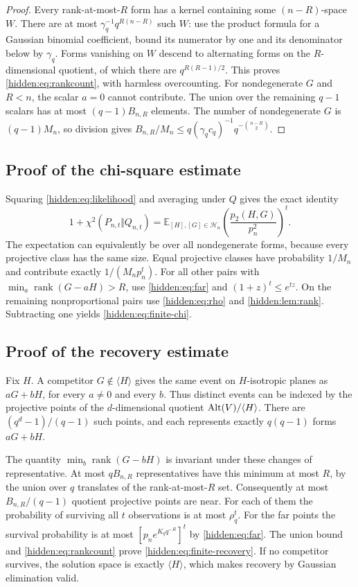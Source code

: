 \begin{proof}
Every rank-at-most-$R$ form has a kernel containing some $(n-R)$-space
$W$. There are at most
$\gamma_q^{-1}q^{R(n-R)}$ such $W$: use the product formula for a Gaussian
binomial coefficient, bound its numerator by one and its denominator
below by $\gamma_q$. Forms vanishing on $W$ descend to alternating forms
on the $R$-dimensional quotient, of which there are $q^{R(R-1)/2}$.
This proves \eqref{hidden:eq:rankcount}, with harmless overcounting.
For nondegenerate $G$ and $R<n$, the scalar $a=0$ cannot contribute.
The union over the remaining $q-1$ scalars has at most $(q-1)B_{n,R}$
elements. The number of nondegenerate $G$ is $(q-1)M_n$, so division
gives $B_{n,R}/M_n\le q(\gamma_qc_q)^{-1}q^{-\binom{n-R}{2}}$.
\end{proof}

\subsection{Proof of the chi-square estimate}

Squaring \eqref{hidden:eq:likelihood} and averaging under $Q$ gives the
exact identity
\begin{equation}\label{hidden:eq:secondmoment}
 1+\chi^2(P_{n,t}\Vert Q_{n,t})
 =\mathbb E_{[H],[G]\in\mathcal H_n}
       \left(\frac{p_2(H,G)}{p_n^2}\right)^t.
\end{equation}
The expectation can equivalently be over all nondegenerate forms,
because every projective class has the same size. Equal projective
classes have probability $1/M_n$ and contribute exactly
$1/(M_np_n^t)$. For all other pairs with
$\min_a\operatorname{rank}(G-aH)>R$, use \eqref{hidden:eq:far} and
$(1+z)^t\le e^{tz}$. On the remaining nonproportional pairs use
\eqref{hidden:eq:rho} and \cref{hidden:lem:rank}. Subtracting one yields
\eqref{hidden:eq:finite-chi}.

\subsection{Proof of the recovery estimate}

Fix $H$. A competitor $G\notin\langle H\rangle$ gives the same event
on $H$-isotropic planes as $aG+bH$, for every $a\ne0$ and every $b$.
Thus distinct events can be indexed by the projective points of the
$d$-dimensional quotient $\operatorname{Alt}(V)/\langle H\rangle$. There are
$(q^d-1)/(q-1)$ such points, and each represents exactly $q(q-1)$
forms $aG+bH$.

The quantity $\min_b\operatorname{rank}(G-bH)$ is invariant under these
changes of representative. At most $qB_{n,R}$ representatives have
this minimum at most $R$, by the union over $q$ translates of the
rank-at-most-$R$ set. Consequently at most $B_{n,R}/(q-1)$ quotient
projective points are near. For each of them the probability of surviving
all $t$ observations is at most $\rho_q^t$. For the far points the
survival probability is at most $[p_ne^{K_qq^{-R}}]^t$ by
\eqref{hidden:eq:far}. The union bound and
\eqref{hidden:eq:rankcount} prove \eqref{hidden:eq:finite-recovery}.
If no competitor survives, the solution space is exactly
$\langle H\rangle$, which makes recovery by Gaussian elimination valid.

